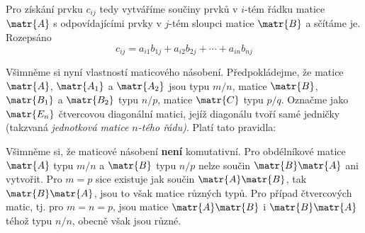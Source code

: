       Pro získání prvku \(c_{ij}\) tedy vytváříme součiny prvků v \(i\)-tém řádku matice
      \(\matr{A}\) s odpovídajícími prvky v \(j\)-tém sloupci matice \(\matr{B}\) a sčítáme je.
      Rozepsáno
      \begin{equation*}
        c_{ij} = a_{i1}b_{1j} + a_{i2}b_{2j} + \cdots + a_{in}b_{nj} 
      \end{equation*}
    
      
      Všimněme si nyní vlastností maticového násobení. Předpokládejme, že matice \(\matr{A}\),
      \(\matr{A_1}\) a \(\matr{A_2}\) jsou typu \(m/n\), matice \(\matr{B}\), \(\matr{B_1}\) a
      \(\matr{B_2}\) typu \(n/p\), matice \(\matr{C}\) typu \(p/q\). Označme jako \(\matr{E_n}\)
      čtvercovou diagonální matici, jejíž diagonálu tvoří samé jedničky (takzvaná \emph{jednotková
      matice \(n\)-tého řádu)}. Platí tato pravidla:
      
      \begin{table}[ht!]
        \centering
      \end{table}
      
      Všimněme si, že maticové násobení \textbf{není} komutativní. Pro obdélníkové matice
      \(\matr{A}\) typu \(m/n\) a \(\matr{B}\) typu \(n/p\) nelze součin \(\matr{B}\matr{A}\) ani
      vytvořit. Pro \(m = p\) sice existuje jak součin \(\matr{A}\matr{B}\), tak
      \(\matr{B}\matr{A}\), jsou to však matice různých typů. Pro případ čtvercových matic, tj. pro
      \(m = n = p\), jsou matice \(\matr{A}\matr{B}\) i \(\matr{B}\matr{A}\) téhož typu \(n/n\),
      obecně však jsou různé.
      
